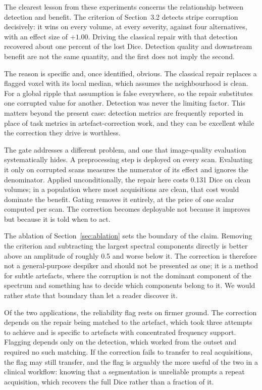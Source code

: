 \documentclass[12pt]{article}
\theoremstyle{definition}
\theoremstyle{plain}
\begin{document}
The clearest lesson from these experiments concerns the relationship between
detection and benefit. The criterion of Section~3.2 detects stripe corruption
decisively: it wins on every volume, at every severity, against four alternatives,
with an effect size of $+1.00$. Driving the classical repair with that detection
recovered about one percent of the lost Dice. Detection quality and downstream
benefit are not the same quantity, and the first does not imply the second.

The reason is specific and, once identified, obvious. The classical repair replaces
a flagged voxel with its local median, which assumes the neighbourhood is clean. For
a global ripple that assumption is false everywhere, so the repair substitutes one
corrupted value for another. Detection was never the limiting factor. This matters
beyond the present case: detection metrics are frequently reported in place of task
metrics in artefact-correction work, and they can be excellent while the correction
they drive is worthless.

The gate addresses a different problem, and one that image-quality evaluation
systematically hides. A preprocessing step is deployed on every scan. Evaluating it
only on corrupted scans measures the numerator of its effect and ignores the
denominator. Applied unconditionally, the repair here costs 0.131 Dice on clean
volumes; in a population where most acquisitions are clean, that cost would dominate
the benefit. Gating removes it entirely, at the price of one scalar computed per
scan. The correction becomes deployable not because it improves but because it is
told when to act.

The ablation of Section~\ref{sec:ablation} sets the boundary of the claim. Removing
the criterion and subtracting the largest spectral components directly is better
above an amplitude of roughly 0.5 and worse below it. The correction is therefore
not a general-purpose despiker and should not be presented as one; it is a method
for subtle artefacts, where the corruption is not the dominant component of the
spectrum and something has to decide which components belong to it. We would rather
state that boundary than let a reader discover it.

Of the two applications, the reliability flag rests on firmer ground. The correction
depends on the repair being matched to the artefact, which took three attempts to
achieve and is specific to artefacts with concentrated frequency support. Flagging
depends only on the detection, which worked from the outset and required no such
matching. If the correction fails to transfer to real acquisitions, the flag may
still transfer, and the flag is arguably the more useful of the two in a clinical
workflow: knowing that a segmentation is unreliable prompts a repeat acquisition,
which recovers the full Dice rather than a fraction of it.
\end{document}

